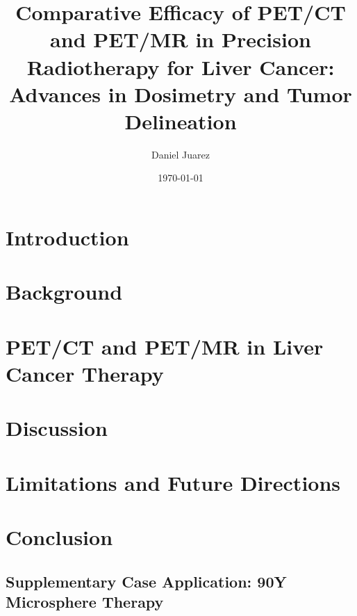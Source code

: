\documentclass[11pt]{article} %
\title{Comparative Efficacy of PET/CT and PET/MR in Precision Radiotherapy for Liver Cancer: Advances in Dosimetry and Tumor Delineation}
\author{Daniel Juarez}
\date{\today}
\begin{document}
\maketitle

\begin{multicols}{2}


\section{Introduction}


\section{Background}


\end{multicols}

\section{PET/CT and PET/MR in Liver Cancer Therapy}


\begin{multicols}{2}


\section{Discussion}


\section{Limitations and Future Directions}


\section{Conclusion}


\end{multicols}


\begin{appendices}
	
	\section{Supplementary Case Application: 90Y Microsphere Therapy}
	
	
\end{appendices}



\end{document}
